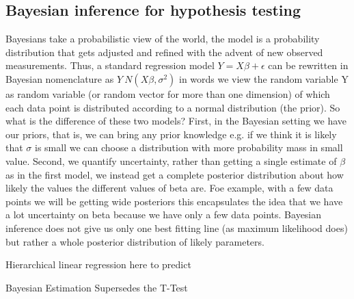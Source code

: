\documentclass[11pt]{article}
\theoremstyle{definition}
\theoremstyle{remark}
\begin{document}
\subsection{Bayesian inference for hypothesis testing}
\label{sse:res}
%
Bayesians take a probabilistic view of the world, the model is a probability distribution that gets adjusted and  refined with the advent of new observed measurements. Thus, a standard regression model $Y = X\beta + \epsilon$ can be rewritten in Bayesian nomenclature as
$Y ~ N(X \beta, \sigma^2)$ in words we view the random variable Y as random variable (or random vector for more than one dimension) of which each data point is distributed according to a normal distribution (the prior). So what is the difference of these two models? First, in the Bayesian setting we have our priors, that is, we can bring any prior knowledge e.g. if we think it is likely that $\sigma$ is small we can choose a distribution with more probability mass in small value. Second, we quantify uncertainty, rather than getting a single estimate of $\beta$ as in the first model, we instead get a complete posterior distribution about how likely the values the different values of beta are. Foe example, with a few data points we will be getting wide posteriors this encapsulates the idea that we have a lot uncertainty on beta because we have only a few data points.
Bayesian inference does not give us only one best fitting line (as maximum likelihood does) but rather a whole posterior distribution of likely parameters.

Hierarchical linear regression here to predict \cite{gelman2006data}


Bayesian Estimation Supersedes the T-Test
\cite{kruschke2013bayesian}

\end{document}
